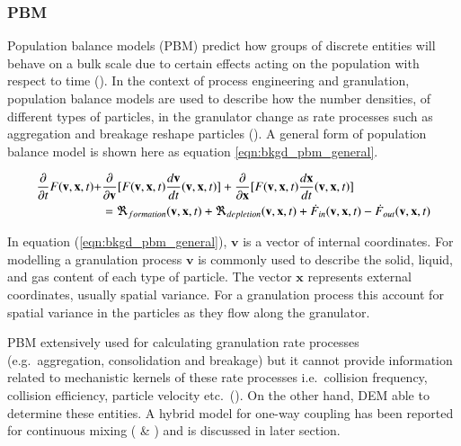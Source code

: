 \documentclass[preprint,11pt,authoryear]{elsarticle}
\begin{document}
	    \subsubsection{PBM}
	    \par Population balance models (PBM) predict how groups of discrete entities will behave on a bulk scale due to certain effects acting on the population with respect to time (\cite{ramkrishna2014}). In the context of process engineering and granulation, population balance models are used to describe how the number densities, of different types of particles, in the granulator change as rate processes such as aggregation and breakage reshape particles (\cite{Barrasso2013}). A general form of population balance model is shown here as equation \ref{eqn:bkgd_pbm_general}.
	    
	    \begin{align}
	    \frac{ \partial}{\partial t}F(\textbf{v},\textbf{x},t) +& \frac{\partial}{\partial \textbf{v}}[F(\textbf{v},\textbf{x},t)\frac{d\textbf{v}}{dt}(\textbf{v},\textbf{x},t)] + \frac{\partial}{\partial \textbf{x}}[F(\textbf{v},\textbf{x},t)\frac{d\textbf{x}}{dt}(\textbf{v},\textbf{x},t)] \notag\\
	    &= \Re_{formation}(\textbf{v},\textbf{x},t)+\Re_{depletion}(\textbf{v},\textbf{x},t)+\dot{F}_{in}(\textbf{v},\textbf{x},t)-\dot{F}_{out}(\textbf{v},\textbf{x},t)
	    \label{eqn:bkgd_pbm_general} 
	    \end{align}
	    
    \par In equation (\ref{eqn:bkgd_pbm_general}), $\textbf{v}$ is a vector of internal coordinates. For modelling a granulation process $\textbf{v}$ is commonly used to describe the solid, liquid, and gas content of each type of particle. The vector $\textbf{x}$ represents external coordinates, usually spatial variance. For a granulation process this  account for spatial variance in the particles as they flow along the granulator.
    \par PBM extensively used for calculating granulation rate processes (e.g.~aggregation, consolidation and breakage) but it cannot provide information related to mechanistic kernels of these rate processes i.e.~collision frequency, collision efficiency, particle velocity etc.~(\cite{sen2014}). On the other hand, DEM able to determine these entities. A hybrid model for one-way coupling has been reported for continuous mixing (\cite{sen2013} \& \cite{sen2013b}) and is discussed in later section.
	    
\end{document}
